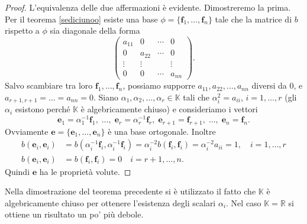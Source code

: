 \documentclass{article}
\theoremstyle{plain}
\theoremstyle{definition}
\theoremstyle{remark}
\begin{document}
\begin{proof}
L'equivalenza delle due affermazioni è evidente. Dimostreremo la prima. 
Per il teorema \ref{sediciunoo} esiste una base $\phi = \{\mathbf{f}_1, \ldots, \mathbf{f}_n\}$ 
tale che la matrice di $b$ rispetto a $\phi$ sia diagonale della forma
\[
\begin{pmatrix}
a_{11} & 0 & \cdots & 0 \\
0 & a_{22} & \cdots & 0 \\
\vdots & \vdots & & \vdots \\
0 & 0 & \cdots & a_{nn}
\end{pmatrix}.
\]    
Salvo scambiare tra loro $\mathbf{f}_1, \ldots, \mathbf{f}_n$, possiamo supporre $a_{11}, a_{22}, \ldots, a_{nn}$ 
diversi da $0$, e $a_{r+1,r+1} = \ldots = a_{nn} = 0$. Siano $\alpha_1, \alpha_2, \ldots, \alpha_r \in \mathbb{K}$ 
tali che $\alpha_i^2 = a_{ii}$, $i = 1, \ldots, r$ (gli $\alpha_i$ esistono perché $\mathbb{K}$ è algebricamente 
chiuso) e consideriamo i vettori
\[\mathbf{e}_1 = \alpha_1^{-1}\mathbf{f}_1,\;\ldots,\;\mathbf{e}_r=\alpha_r^{-1}\mathbf{f}_r,\;\mathbf{e}_{r+1}=\mathbf{f}_{r+1},\;\ldots,\;\mathbf{e}_n=\mathbf{f}_n.\]
Ovviamente $\mathbf{e} = \{\mathbf{e}_1, \ldots, \mathbf{e}_n\}$ è una base ortogonale. Inoltre
\begin{align*}
b(\mathbf{e}_i, \mathbf{e}_i) &= b(\alpha_i^{-1}\mathbf{f}_i, \alpha_i^{-1}\mathbf{f}_i) = \alpha_i^{-2}b(\mathbf{f}_i, \mathbf{f}_i) = \alpha_i^{-2}a_{ii} = 1, \quad i = 1, \ldots, r \\
b(\mathbf{e}_i, \mathbf{e}_i) &= b(\mathbf{f}_i, \mathbf{f}_i) = 0 \quad i = r+1, \ldots, n.
\end{align*}
Quindi $\mathbf{e}$ ha le proprietà volute.
\end{proof}

\vspace{10pt}

Nella dimostrazione del teorema precedente si è utilizzato il fatto che $\mathbb{K}$ è 
algebricamente chiuso per ottenere l'esistenza degli scalari $\alpha_i$. Nel caso 
$\mathbb{K} = \mathbb{R}$ si ottiene un risultato un po' più debole.

\vspace{10pt}
\end{document}
